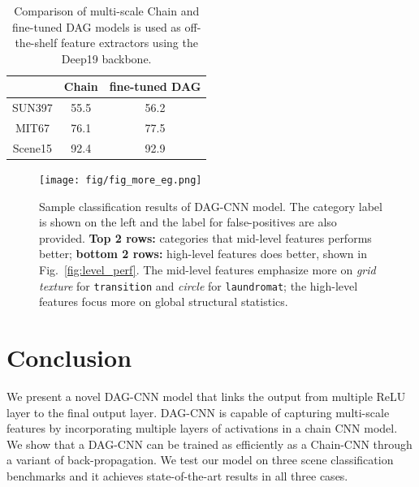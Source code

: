 \documentclass[10pt,twocolumn,letterpaper]{article}
\begin{document}
\begin{table}[htbp]
\begin{center}
\begin{tabular}{|c|c|c|}
\hline
 & Chain &  fine-tuned DAG\\
\hline
SUN397 & 55.5 & 56.2 \\
MIT67 & 76.1 & 77.5 \\
Scene15 & 92.4 & 92.9 \\
\hline
\end{tabular}
\end{center}
\caption{Comparison of multi-scale Chain and fine-tuned DAG models is used as off-the-shelf feature extractors using the Deep19 backbone.}
\label{table:ft_extractor}
\end{table}


\begin{figure}[htbp]
\centering
	\texttt{[image: fig/fig\_more\_eg.png]}
\caption{Sample classification results of DAG-CNN model. The category label is shown on the left and the label for false-positives are also provided. \textbf{Top 2 rows:} categories that mid-level features performs better; \textbf{bottom 2 rows:} high-level features does better, shown in Fig.~\ref{fig:level_perf}. The mid-level features emphasize more on \textit{grid texture} for {\tt transition} and \textit{circle} for {\tt laundromat}; the high-level features focus more on global structural statistics.}

\label{fig:more_eg}
\end{figure}


\section{Conclusion}

We present a novel DAG-CNN model that links the output from multiple ReLU layer to the final output layer. DAG-CNN is capable of capturing multi-scale features by incorporating multiple layers of activations in a chain CNN model. We show that a DAG-CNN can be trained as efficiently as a Chain-CNN through a variant of back-propagation. We test our model on three scene classification benchmarks and it achieves state-of-the-art results in all three cases.


{\small


}
\end{document}
